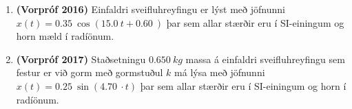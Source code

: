 \ifdefined \wholebook \else\documentclass[oneside]{book}\usepackage{EdlBook}\graphicspath{{figures/}}
\begin{document}
\begin{enumerate}[label = \textbf{Dæmi \thechapter.\arabic*.}]

\item \textbf{(Vorpróf 2016)} Einfaldri sveifluhreyfingu er lýst með jöfnunni $x(t) = \SI{0.35}{} \cos(\SI{15.0}{} t + \SI{0.60}{})$ þar sem allar stærðir eru í SI-einingum og horn mæld í radíönum. 

\item \textbf{(Vorpróf 2017)} Staðsetningu $\SI{0.650}{kg}$ massa á einfaldri sveifluhreyfingu sem festur er við gorm með gormstuðul $k$ má lýsa með jöfnunni $x(t) = \SI{0.25}{} \sin(\SI{4.70}{}\cdot t)$ þar sem allar stærðir eru í SI-einingum og horn í radíönum. 


\end{enumerate}
\end{document}
